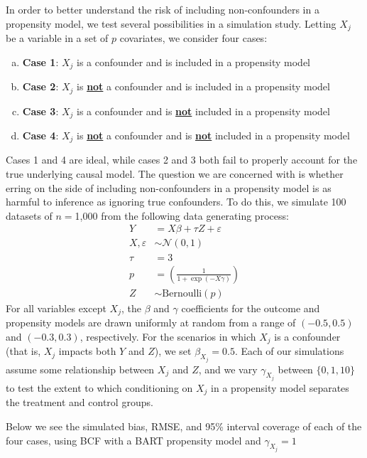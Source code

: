 \documentclass[aos]{imsart}
\begin{document}
In order to better understand the risk of including non-confounders in a propensity model, we test several possibilities in a simulation study. Letting $X_j$ be a variable in a set of $p$ covariates, 
we consider four cases:
\begin{enumerate}[a)]
\item \textbf{Case 1}: $X_j$ is a confounder and is included in a propensity model
\item \textbf{Case 2}: $X_j$ is \underline{\textbf{not}} a confounder and is included in a propensity model  
\item \textbf{Case 3}: $X_j$ is a confounder and is \underline{\textbf{not}} included in a propensity model
\item \textbf{Case 4}: $X_j$ is \underline{\textbf{not}} a confounder and is \underline{\textbf{not}} included in a propensity model
\end{enumerate}
Cases 1 and 4 are ideal, while cases 2 and 3 both fail to properly account for the true underlying causal model. The question we are concerned with is whether erring on the side 
of including non-confounders in a propensity model is as harmful to inference as ignoring true confounders. To do this, we simulate 100 datasets of $n = $1,000 from the following data generating process:
\begin{align*}
Y &= X\beta + \tau Z + \varepsilon\\
X, \varepsilon &\sim \mathcal{N}(0, 1)\\
\tau &= 3\\
p & = \left(\frac{1}{1+\exp(-X\gamma)}\right)\\
Z & \sim \textrm{Bernoulli}(p)
\end{align*}
For all variables except $X_j$, the $\beta$ and $\gamma$ coefficients for the outcome and propensity models are drawn uniformly at random from a range of $(-0.5, 0.5)$ and $(-0.3, 0.3)$, 
respectively. For the scenarios in which $X_j$ is a confounder (that is, $X_j$ impacts both $Y$ and $Z$), we set $\beta_{X_j} = 0.5$.
Each of our simulations assume some relationship between $X_j$ and $Z$, and we vary $\gamma_{X_j}$ between $\{0, 1, 10\}$ to test the extent to which conditioning on $X_j$ in a 
propensity model separates the treatment and control groups.

Below we see the simulated bias, RMSE, and 95\% interval coverage of each of the four cases, using BCF with a BART propensity model and $\gamma_{X_j} = 1$
\end{document}
